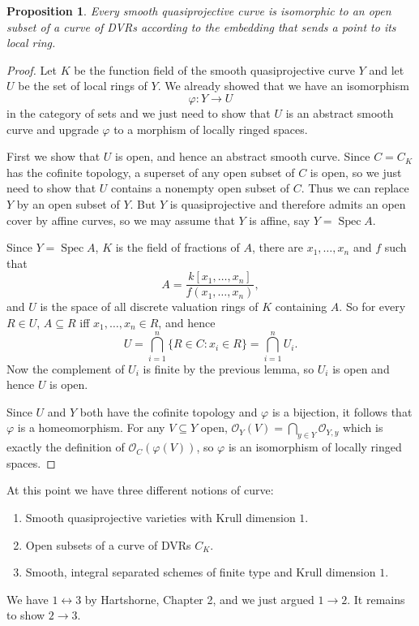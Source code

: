 \documentclass[reqno,12pt,letterpaper]{amsart}
\DeclareMathOperator{\Spec}{Spec}
\newcommand{\Olo}{\mathscr O}
\newtheorem{proposition}[theorem]{Proposition}
\theoremstyle{definition}
\begin{document}
\begin{proposition}
Every smooth quasiprojective curve is isomorphic to an open subset of a curve of DVRs according to the embedding that sends a point to its local ring.
\end{proposition}
\begin{proof}
Let $K$ be the function field of the smooth quasiprojective curve $Y$ and let $U$ be the set of local rings of $Y$.
We already showed that we have an isomorphism
$$\varphi: Y \to U$$
in the category of sets and we just need to show that $U$ is an abstract smooth curve and upgrade $\varphi$ to a morphism of locally ringed spaces.

First we show that $U$ is open, and hence an abstract smooth curve.
Since $C = C_K$ has the cofinite topology, a superset of any open subset of $C$ is open, so we just need to show that $U$ contains a nonempty open subset of $C$.
Thus we can replace $Y$ by an open subset of $Y$.
But $Y$ is quasiprojective and therefore admits an open cover by affine curves, so we may assume that $Y$ is affine, say $Y = \Spec A$.

Since $Y = \Spec A$, $K$ is the field of fractions of $A$, there are $x_1, \dots, x_n$ and $f$ such that
$$A = \frac{k[x_1, \dots, x_n]}{f(x_1, \dots, x_n)},$$
and $U$ is the space of all discrete valuation rings of $K$ containing $A$.
So for every $R \in U$, $A \subseteq R$ iff $x_1, \dots, x_n \in R$, and hence
$$U = \bigcap_{i=1}^n \{R \in C: x_i \in R\} = \bigcap_{i=1}^n U_i.$$
Now the complement of $U_i$ is finite by the previous lemma, so $U_i$ is open and hence $U$ is open.

Since $U$ and $Y$ both have the cofinite topology and $\varphi$ is a bijection, it follows that $\varphi$ is a homeomorphism.
For any $V \subseteq Y$ open, $\Olo_Y(V) = \bigcap_{y \in Y} \Olo_{Y,y}$ which is exactly the definition of $\Olo_C(\varphi(V))$, so $\varphi$ is an isomorphism of locally ringed spaces.
\end{proof}

At this point we have three different notions of curve:
\begin{enumerate}
\item Smooth quasiprojective varieties with Krull dimension $1$.
\item Open subsets of a curve of DVRs $C_K$.
\item Smooth, integral separated schemes of finite type and Krull dimension $1$.
\end{enumerate}
We have $1 \leftrightarrow 3$ by Hartshorne, Chapter 2, and we just argued $1 \to 2$.
It remains to show $2 \to 3$.
\end{document}
